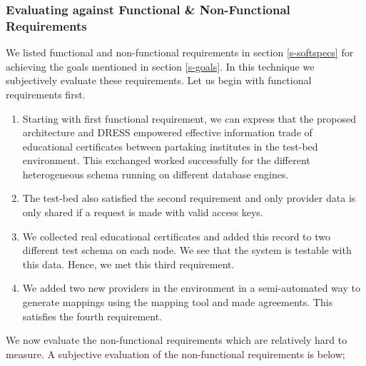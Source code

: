 \documentclass[12pt,a4paper,oneside]{book}
\begin{document}
		\subsubsection{Evaluating against Functional \& Non-Functional Requirements}
		We listed functional and non-functional requirements in section \ref{s-softspecs} for achieving the goals mentioned in section \ref{s-goals}.  In this technique we subjectively evaluate these requirements. Let us begin with functional requirements first.
	\begin{enumerate}  

		\item Starting with first functional requirement, we can express that the proposed architecture and DRESS empowered effective information trade of educational certificates between partaking institutes in the test-bed environment. This exchanged worked successfully for the different heterogeneous schema running on different database engines. 

		\item The test-bed also satisfied the second requirement and only provider data is only shared if a request is made with valid access keys. 
	
		\item We collected real educational certificates and added this record to two different test schema on each node. We see that the system is testable with this data. Hence, we met this third requirement.
		
		\item We added two new providers in the environment in a semi-automated way to generate mappings using the mapping tool and made agreements. This satisfies the fourth requirement.

	\end{enumerate}
		
	We now evaluate the non-functional requirements which are relatively hard to measure. A subjective evaluation of the non-functional requirements is below;
	
\end{document}

